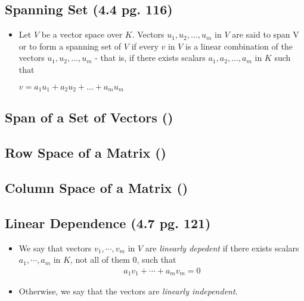 \documentclass[hidelinks, 11pt, openleft]{scrartcl}
\begin{document}
    \subsection*{Spanning Set (4.4 pg. 116)}
        \begin{itemize}
            \item Let $V$ be a vector space over $K$. Vectors $u_{1}, u_{2}, \dots , u_{m}$ in $V$ are said to span V or to form a spanning set of $V$ if every $v$ in $V$ is a linear combination of the vectors $u_{1}, u_{2}, \dots , u_{m}$ - that is, if there exists scalars $a_{1}, a_{2}, \dots , a_{m}$ in $K$ such that 
            \begin{center}
                $v = a_{1}u_{1} + a_{2}u_{2} + \dots + a_{m}u_{m}$
            \end{center}
        \end{itemize}

    \subsection*{Span of a Set of Vectors ()}
    \vspace{10 cm}
    
    \subsection*{Row Space of a Matrix ()}
    \vspace{10 cm}
    
    \subsection*{Column Space of a Matrix ()}
    \vspace{10 cm}

    \subsection*{Linear Dependence (4.7 pg. 121)}
        \begin{itemize}
            \item We say that vectors $v_1, \cdots ,v_m$ in $V$ are \textit{linearly depedent} if there exists scalars $a_1, \cdots, a_m$ in $K$, not all of them 0, such that
                \begin{align*}
                    a_1v_1 + \cdots + a_mv_m = 0
                \end{align*}
            \item Otherwise, we say that the vectors are \textit{linearly independent}.
        \end{itemize}
    
\end{document}
